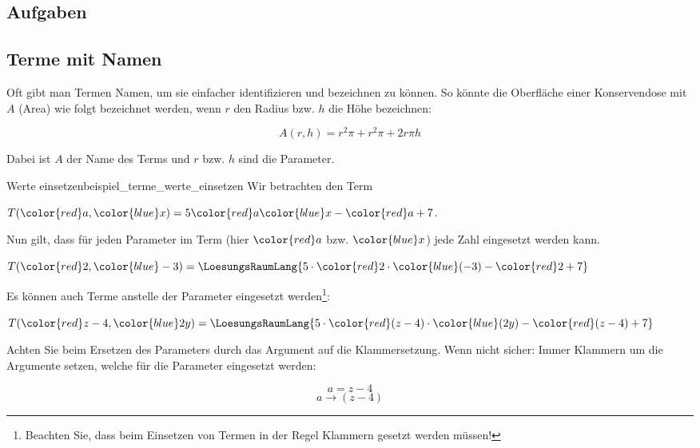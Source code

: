 
\subsection*{Aufgaben}

\newpage
\subsection{Terme mit Namen}
Oft gibt man Termen Namen, um sie einfacher identifizieren und
bezeichnen zu können. So könnte \zB die Oberfläche einer
Konservendose mit $A$ (Area) wie folgt bezeichnet werden, wenn $r$ den
Radius bzw. $h$ die Höhe bezeichnen:

$$A(r, h) = r^2\pi + r^2\pi + 2r\pi{}h$$

Dabei ist $A$ der Name des Terms und $r$ bzw. $h$ sind die Parameter.
\vspace{3mm}
\begin{beispiel}{Werte einsetzen}{beispiel_terme_werte_einsetzen}
  Wir betrachten den Term

  $T({\color{red}a}, {\color{blue}x}) = 5{\color{red}a}{\color{blue}x} - {\color{red}a} + 7$.

  Nun gilt, dass für jeden Parameter im Term (hier ${\color{red}a}$
  bzw. ${\color{blue}x}$) jede Zahl eingesetzt
  werden kann.\leserluft{}

  $T({\color{red}2}, {\color{blue}-3}) = \LoesungsRaumLang{5\cdot{}{\color{red}2}\cdot{\color{blue}(-3)} - {\color{red}2} + 7}$

  Es können auch Terme anstelle der Parameter eingesetzt
  werden\footnote{Beachten Sie, dass beim Einsetzen von Termen in der Regel
  Klammern gesetzt werden müssen!}:\leserluft{}

  $T({\color{red}z-4}, {\color{blue}2y}) =
  \LoesungsRaumLang{5 \cdot{} {\color{red}(z-4)} \cdot {\color{blue}(2y)} - {\color{red}(z-4)} + 7}$
\end{beispiel}

\begin{bemerkung}{}{}
Achten Sie beim Ersetzen des Parameters durch das Argument auf die
Klammersetzung. Wenn nicht sicher: Immer Klammern um die Argumente
setzen, welche für die Parameter eingesetzt werden:

$$ a = z-4$$
$$ a  \rightarrow (z-4)$$
\end{bemerkung}

